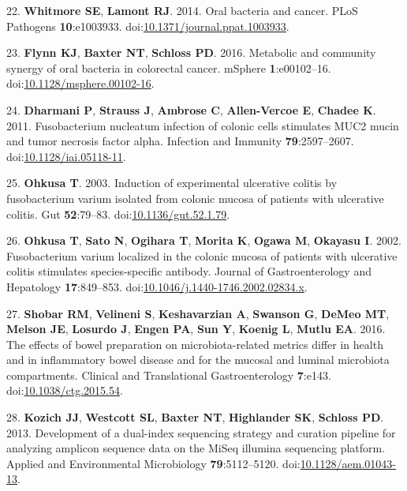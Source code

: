 \documentclass[11pt,]{article}
\begin{document}
\hypertarget{ref-Whitmore2014}{}
22. \textbf{Whitmore SE}, \textbf{Lamont RJ}. 2014. Oral bacteria and
cancer. PLoS Pathogens \textbf{10}:e1003933.
doi:\href{https://doi.org/10.1371/journal.ppat.1003933}{10.1371/journal.ppat.1003933}.

\hypertarget{ref-Flynn2016}{}
23. \textbf{Flynn KJ}, \textbf{Baxter NT}, \textbf{Schloss PD}. 2016.
Metabolic and community synergy of oral bacteria in colorectal cancer.
mSphere \textbf{1}:e00102--16.
doi:\href{https://doi.org/10.1128/msphere.00102-16}{10.1128/msphere.00102-16}.

\hypertarget{ref-Dharmani2011}{}
24. \textbf{Dharmani P}, \textbf{Strauss J}, \textbf{Ambrose C},
\textbf{Allen-Vercoe E}, \textbf{Chadee K}. 2011. Fusobacterium
nucleatum infection of colonic cells stimulates MUC2 mucin and tumor
necrosis factor alpha. Infection and Immunity \textbf{79}:2597--2607.
doi:\href{https://doi.org/10.1128/iai.05118-11}{10.1128/iai.05118-11}.

\hypertarget{ref-Ohkusa2003}{}
25. \textbf{Ohkusa T}. 2003. Induction of experimental ulcerative
colitis by fusobacterium varium isolated from colonic mucosa of patients
with ulcerative colitis. Gut \textbf{52}:79--83.
doi:\href{https://doi.org/10.1136/gut.52.1.79}{10.1136/gut.52.1.79}.

\hypertarget{ref-Ohkusa2002}{}
26. \textbf{Ohkusa T}, \textbf{Sato N}, \textbf{Ogihara T},
\textbf{Morita K}, \textbf{Ogawa M}, \textbf{Okayasu I}. 2002.
Fusobacterium varium localized in the colonic mucosa of patients with
ulcerative colitis stimulates species-specific antibody. Journal of
Gastroenterology and Hepatology \textbf{17}:849--853.
doi:\href{https://doi.org/10.1046/j.1440-1746.2002.02834.x}{10.1046/j.1440-1746.2002.02834.x}.

\hypertarget{ref-Shobar2016}{}
27. \textbf{Shobar RM}, \textbf{Velineni S}, \textbf{Keshavarzian A},
\textbf{Swanson G}, \textbf{DeMeo MT}, \textbf{Melson JE},
\textbf{Losurdo J}, \textbf{Engen PA}, \textbf{Sun Y}, \textbf{Koenig
L}, \textbf{Mutlu EA}. 2016. The effects of bowel preparation on
microbiota-related metrics differ in health and in inflammatory bowel
disease and for the mucosal and luminal microbiota compartments.
Clinical and Translational Gastroenterology \textbf{7}:e143.
doi:\href{https://doi.org/10.1038/ctg.2015.54}{10.1038/ctg.2015.54}.

\hypertarget{ref-Kozich2013}{}
28. \textbf{Kozich JJ}, \textbf{Westcott SL}, \textbf{Baxter NT},
\textbf{Highlander SK}, \textbf{Schloss PD}. 2013. Development of a
dual-index sequencing strategy and curation pipeline for analyzing
amplicon sequence data on the MiSeq illumina sequencing platform.
Applied and Environmental Microbiology \textbf{79}:5112--5120.
doi:\href{https://doi.org/10.1128/aem.01043-13}{10.1128/aem.01043-13}.
\end{document}
